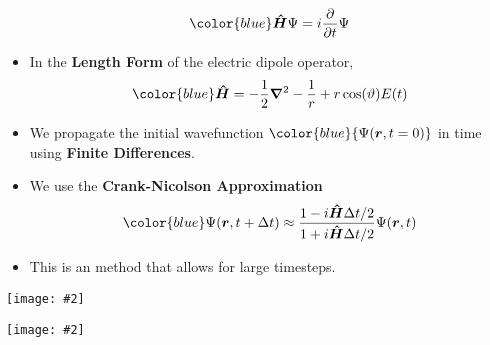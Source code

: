 \documentclass[landscape,a0b,final]{a0poster}
\newenvironment{poster}{
  \begin{center}
  \begin{minipage}[c]{0.98\textwidth}
}{
  \end{minipage} 
  \end{center}
}
\newcommand{\pbox}[4]{
\psshadowbox[#3]{
\begin{minipage}[t][#2][t]{#1}
#4
\end{minipage}
}}
\newcommand{\myfig}[3][0]{
\begin{center}
  \vspace{1.5cm}
  \texttt{[image: \#2]}
  \nobreak\medskip
\end{center}}
\begin{document}
\begin{poster}
\begin{multicols}{3}
\begin{itemize}
\vspace{-.5cm}
\begin{equation}
{\color{blue}\bm{\hat{H}}\Psi = i\frac{\partial}{\partial t} \Psi}
\end{equation}
\item {In the \bf\color{red}Length Form} of the electric dipole operator,
\begin{equation}
{\color{blue}\bm{\hat{H}} = -\frac{1}{2} \bm{\nabla}^2 - \frac{1}{r} +r \cos(\vartheta) E(t)}
\end{equation}
\vspace{-.5cm}
\item We propagate the initial wavefunction ${\color{blue}{\Psi(\bm{r},t=0)}}$ in time using {\bf \color{newgreen}Finite Differences}. 
\item We use the {\bf \color{newgreen} Crank-Nicolson Approximation} 
\vspace{-.5cm}
\begin{equation}
{\color{blue}\Psi(\bm{r},t+\Delta t) \approx \frac{1-i\bm{\hat{H}}\Delta t/2}{1+i\bm{\hat{H}}\Delta t/2}\Psi(\bm{r},t)}
\end{equation}
\vspace{-.5cm}
\item This is an {\color{newgreen}{\bf implicit}} method that allows for large timesteps.
\end{itemize}

\vspace{0.375cm}\begin{center}\pbox{0.8\columnwidth}{}{linewidth=2mm,framearc=0.1,linecolor=lightblue,fillstyle=gradient,
                          gradangle=0,gradbegin=whiteblue,gradend=whiteblue,gradmidpoint=1.0,framesep=1em}{\begin{center}{\Large\bf The Field}\end{center}}\end{center}

  \vspace{-0.75cm}
  \setlength{\columnsep}{0pt}
  \setlength{\columnseprule}{0pt}
  \hspace{-2cm}
  \begin{multicols}{2}
  \begin{center}
  \myfig{c_pulse_350_2_36_2.ps}{.85}
  \end{center}

  \begin{center}
  \myfig{c_pulse_350_10_20_10.ps}{.85}
  \end{center}
  

\end{multicols}
\end{multicols}
\end{poster}
\end{document}
